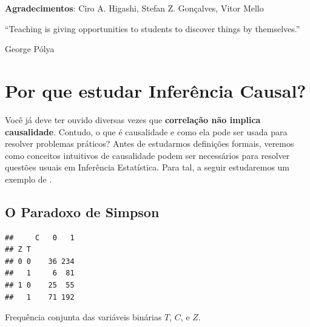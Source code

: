



\maketitle

\vspace{20mm}

\textbf{Agradecimentos}: Ciro A. Higashi, Stefan Z. Gonçalves, Vitor Mello

\newpage

\epigraph{
``Teaching is giving opportunities to students to discover things by themselves.''
}
{George P\'olya}
 
 
\newpage
 
\tableofcontents
  
\newpage




\chapter{Por que estudar Inferência Causal?}
\label{cap:intro}

Você já deve ter ouvido diversas vezes que
\textbf{correlação não implica causalidade}. Contudo,
o que é causalidade e como 
ela pode ser usada para resolver problemas práticos?
Antes de estudarmos definições formais,
veremos como conceitos intuitivos de causalidade
podem ser necessários para resolver questões
usuais em Inferência Estatística.
Para tal, a seguir estudaremos um exemplo de \citet{Glymour2016}.

\section{O Paradoxo de Simpson}
\label{sec:simpson}

\begin{table}
\begin{knitrout}
\color{fgcolor}\begin{kframe}
\begin{verbatim}
##     C   0   1
## Z T          
## 0 0    36 234
##   1     6  81
## 1 0    25  55
##   1    71 192
\end{verbatim}
\end{kframe}
\end{knitrout}
 \caption{Frequência conjunta 
 das variáveis binárias $T$, $C$, e $Z$.}
 \label{tabs:simpson}
\end{table}

